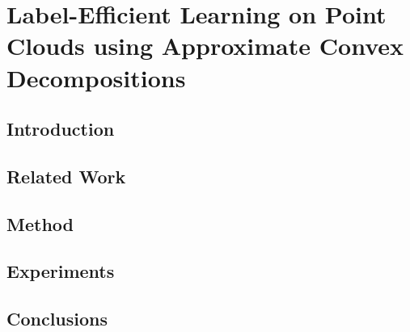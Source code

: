 \chapter{Label-Efficient Learning on Point Clouds using Approximate Convex Decompositions}

\section{Introduction}


\section{Related Work}


\section{Method}


\section{Experiments}


\section{Conclusions}

